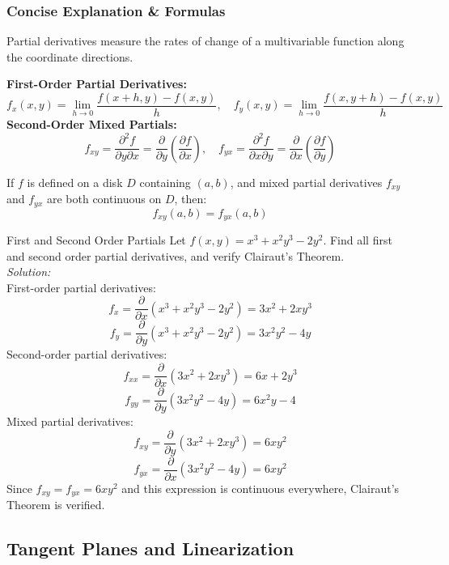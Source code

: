 \documentclass[11pt]{article}
\begin{document}
\subsubsection*{Concise Explanation \& Formulas}
Partial derivatives measure the rates of change of a multivariable function along the coordinate directions.
\begin{formulabox}
    \textbf{First-Order Partial Derivatives:}
    \[ f_x(x,y) = \lim_{h \to 0} \frac{f(x+h,y) - f(x,y)}{h}, \quad f_y(x,y) = \lim_{h \to 0} \frac{f(x,y+h) - f(x,y)}{h} \]
    \textbf{Second-Order Mixed Partials:}
    \[ f_{xy} = \frac{\partial^2 f}{\partial y \partial x} = \frac{\partial}{\partial y}\left(\frac{\partial f}{\partial x}\right), \quad f_{yx} = \frac{\partial^2 f}{\partial x \partial y} = \frac{\partial}{\partial x}\left(\frac{\partial f}{\partial y}\right) \]
\end{formulabox}

\begin{theorembox}[title={Clairaut's Theorem}]
    If $f$ is defined on a disk $D$ containing $(a,b)$, and mixed partial derivatives $f_{xy}$ and $f_{yx}$ are both continuous on $D$, then:
    \[ f_{xy}(a,b) = f_{yx}(a,b) \]
\end{theorembox}

\begin{examplebox}{First and Second Order Partials}
    Let $f(x,y) = x^3 + x^2y^3 - 2y^2$. Find all first and second order partial derivatives, and verify Clairaut's Theorem.\\
    \textit{Solution:}\\
    First-order partial derivatives:
    \[ f_x = \frac{\partial}{\partial x}(x^3 + x^2y^3 - 2y^2) = 3x^2 + 2xy^3 \]
    \[ f_y = \frac{\partial}{\partial y}(x^3 + x^2y^3 - 2y^2) = 3x^2y^2 - 4y \]
    Second-order partial derivatives:
    \[ f_{xx} = \frac{\partial}{\partial x}(3x^2 + 2xy^3) = 6x + 2y^3 \]
    \[ f_{yy} = \frac{\partial}{\partial y}(3x^2y^2 - 4y) = 6x^2y - 4 \]
    Mixed partial derivatives:
    \[ f_{xy} = \frac{\partial}{\partial y}(3x^2 + 2xy^3) = 6xy^2 \]
    \[ f_{yx} = \frac{\partial}{\partial x}(3x^2y^2 - 4y) = 6xy^2 \]
    Since $f_{xy} = f_{yx} = 6xy^2$ and this expression is continuous everywhere, Clairaut's Theorem is verified.
\end{examplebox}


\subsection{Tangent Planes and Linearization}
\end{document}
